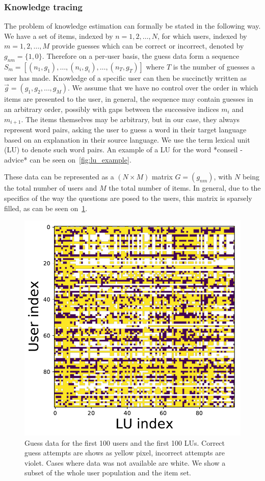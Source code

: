 \subsubsection{Knowledge tracing}
The problem of knowledge estimation can formally be stated in the following way. We have a set of items, indexed by $n = {1, 2, \dots, N}$, for which users, indexed by $m  = {1, 2, \dots, M}$ provide guesses which can be correct or incorrect, denoted by $g_{nm}=\{1, 0\}$. Therefore on a per-user basis, the guess data form a sequence $S_m = [(n_1, g_1), \dots, (n_i, g_i), \dots, (n_T, g_T)]$ where $T$ is the number of guesses a user has made. Knowledge of a specific user can then be succinctly written as $\vec{g} = (g_1, g_2, \dots, g_M)$. We assume that we have no control over the order in which items are presented to the user, in general, the sequence may contain guesses in an arbitrary order, possibly with gaps between the successive indices $m_i$ and $m_{i+1}$. The items themselves may be arbitrary, but in our case, they always represent word pairs, asking the user to guess a word in their target language based on an explanation in their source language. We use the term lexical unit (LU) to denote such word pairs. An example of a LU for the word *conseil - advice* can be seen on~\cref{fig:lu_example}.

These data can be represented as a $(N \times M)$ matrix $G = (g_{nm})$, with $N$ being the total number of users and $M$ the total number of items. In general, due to the specifics of the way the questions are posed to the users, this matrix is sparsely filled, as can be seen on~\cref{fig:user_data}.

\begin{figure}[ht]
\centering
\includegraphics[width=0.5\linewidth]{figures/lingvist/user_data.pdf}
\caption{Guess data for the first 100 users and the first 100 LUs. Correct guess attempts are shows as yellow pixel, incorrect attempts are violet. Cases where data was not available are white. We show a subset of the whole user population and the item set.} 
\label{fig:user_data} 
\end{figure} 


